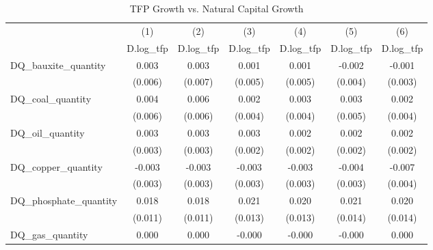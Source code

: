 \begin{table}[htbp]\centering
\def\sym#1{\ifmmode^{#1}\else\(^{#1}\)\fi}
\caption{TFP Growth vs. Natural Capital Growth}
\begin{tabular}{l*{6}{c}}
\hline\hline
            &\multicolumn{1}{c}{(1)}&\multicolumn{1}{c}{(2)}&\multicolumn{1}{c}{(3)}&\multicolumn{1}{c}{(4)}&\multicolumn{1}{c}{(5)}&\multicolumn{1}{c}{(6)}\\
            &\multicolumn{1}{c}{D.log\_tfp}&\multicolumn{1}{c}{D.log\_tfp}&\multicolumn{1}{c}{D.log\_tfp}&\multicolumn{1}{c}{D.log\_tfp}&\multicolumn{1}{c}{D.log\_tfp}&\multicolumn{1}{c}{D.log\_tfp}\\
\hline
DQ\_bauxite\_quantity&       0.003       &       0.003       &       0.001       &       0.001       &      -0.002       &      -0.001       \\
            &     (0.006)       &     (0.007)       &     (0.005)       &     (0.005)       &     (0.004)       &     (0.003)       \\
[1em]
DQ\_coal\_quantity&       0.004       &       0.006       &       0.002       &       0.003       &       0.003       &       0.002       \\
            &     (0.006)       &     (0.006)       &     (0.004)       &     (0.004)       &     (0.005)       &     (0.004)       \\
[1em]
DQ\_oil\_quantity&       0.003       &       0.003       &       0.003       &       0.002       &       0.002       &       0.002       \\
            &     (0.003)       &     (0.003)       &     (0.002)       &     (0.002)       &     (0.002)       &     (0.002)       \\
[1em]
DQ\_copper\_quantity&      -0.003       &      -0.003       &      -0.003       &      -0.003       &      -0.004       &      -0.007       \\
            &     (0.003)       &     (0.003)       &     (0.003)       &     (0.003)       &     (0.003)       &     (0.004)       \\
[1em]
DQ\_phosphate\_quantity&       0.018       &       0.018       &       0.021       &       0.020       &       0.021       &       0.020       \\
            &     (0.011)       &     (0.011)       &     (0.013)       &     (0.013)       &     (0.014)       &     (0.014)       \\
[1em]
DQ\_gas\_quantity&       0.000       &       0.000       &      -0.000       &      -0.000       &      -0.000       &       0.000       \\

\end{tabular}
\end{table}
